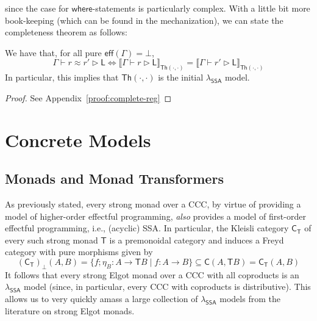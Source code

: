 \documentclass[acmsmall,screen,review]{acmart}
\newcommand{\ms}[1]{\ensuremath{\mathsf{#1}}}
\newcommand{\haslb}[3]{#1 \vdash #2 \rhd #3}
\newcommand{\teqv}{\approx}
\newcommand{\lbeq}[4]{#1 \vdash #2 \teqv #3 \rhd {#4}}
\newcommand{\dnt}[1]{\llbracket{#1}\rrbracket}
\newcommand{\isotopessa}{\(\lambda_{\ms{SSA}}\)}
\begin{document}
since the case for \ms{where}-statements is particularly complex. With a little bit more book-keeping (which can be found in the mechanization), we can state the completeness theorem as follows:
\begin{theorem}[name=Completeness (Regions), restate=completenessregions]
  We have that, for all pure $\ms{eff}(\Gamma) = \bot$,
  $$
    \lbeq{\Gamma}{r}{r'}{\ms{L}} 
    \iff \dnt{\haslb{\Gamma}{r}{\ms{L}}}_{\ms{Th}(\cdot, \cdot)} 
        = \dnt{\haslb{\Gamma}{r'}{\ms{L}}}_{\ms{Th}(\cdot, \cdot)} 
  $$
  In particular, this implies that $\ms{Th}(\cdot, \cdot)$ is the initial \isotopessa{} model.
  \label{thm:complete-reg}
\end{theorem}
\begin{proof}
  See Appendix~\ref{proof:complete-reg}
\end{proof}

\section{Concrete Models}

\label{sec:concrete}

\subsection{Monads and Monad Transformers}

As previously stated, every strong monad over a CCC, by virtue of providing a
model of higher-order effectful programming, \emph{also} provides a model of
first-order effectful programming, i.e., (acyclic) SSA. In particular, the Kleisli
category $\ms{C}_{\ms{T}}$ of every such strong monad $\ms{T}$ is a premonoidal category and
induces a Freyd category with pure morphisms given by
\begin{equation}
  (\ms{C}_{\ms{T}})_{\bot}(A, B) = \{f;\eta_B : A \to \ms{T}B \mid f : A \to B\} 
  \subseteq \ms{C}(A, \ms{T}B) = \ms{C}_{\ms{T}}(A, B)
\end{equation}
It follows that every strong Elgot monad over a CCC with all coproducts is an
\isotopessa{} model (since, in particular, every CCC with coproducts is
distributive). This allows us to very quickly amass a large collection of
\isotopessa{} models from the literature on strong Elgot monads.
\end{document}
